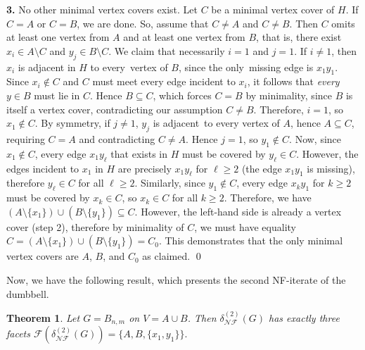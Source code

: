 \documentclass[12pt]{article}
\renewenvironment{proof}{{\noindent\bfseries Proof.}}{\qed}
\theoremstyle{plain}
\newtheorem{theorem}{Theorem}[section]
\theoremstyle{definition}
\newcommand{\F}{\mathcal{F}}
\newcommand{\V}{V}
\newcommand{\A}{A}
\newcommand{\B}{B}
\begin{document}
\begin{proof}
		\smallskip\noindent
		\textbf{3.} No other minimal vertex covers exist. Let $C$ be a minimal vertex cover of $H.$ 	If $C=\A$ or $C=\B$, we are done. So, assume that $C\neq \A$ and $C\neq \B$.
		Then $C$ omits at least one vertex from $\A$ and at least one vertex from $\B$, that is, there exist $x_i\in \A\setminus C$ and $y_j\in \B\setminus C$.		We claim that necessarily $i=1$ and $j=1$.
		 If $i\neq 1$, then $x_i$ is adjacent in $H$ to every vertex of $\B$, since the only missing edge is $x_1y_1$.
		Since $x_i\notin C$ and $C$ must meet every edge incident to $x_i$, it follows that \emph{every} $y\in\B$ must lie in $C$.
		Hence $\B\subseteq C$, which forces $C=\B$ by minimality, since $\B$ is itself a vertex cover,		contradicting our assumption $C\neq \B$. Therefore, $i=1$, so $x_1\notin C$. By symmetry, if $j\neq 1$, $y_j$ is adjacent to every vertex of $\A$, hence $\A\subseteq C$, requiring $C=\A$ and contradicting $C\neq\A$.	Hence $j=1$, so $y_1\notin C$.
		 Now, since $x_1\notin C$, every edge $x_1y_\ell$ that exists in $H$ must be covered by $y_\ell\in C$.
		However, the edges incident to $x_1$ in $H$ are precisely $x_1y_\ell$ for $\ell\ge 2$ (the edge $x_1y_1$ is missing), therefore $y_\ell\in C$ for all $\ell\ge 2$.
		Similarly, since $y_1\notin C$, every edge $x_k y_1$ for $k\ge 2$ must be covered by $x_k\in C$, so $x_k\in C$ for all $k\ge 2$.
		Therefore, we have $(\A\setminus\{x_1\})\cup(\B\setminus\{y_1\}) \subseteq C.$ 	However, the left-hand side is already a vertex cover (step 2), therefore by minimality of $C$, we must have equality
		 $C=(\A\setminus\{x_1\})\cup(\B\setminus\{y_1\})=C_0.$ 
		This demonstrates that the only minimal vertex covers are $\A$, $\B$, and $C_0$ as claimed.
	\end{proof}
	
	\medskip
	Now, we have the following result, which presents the second NF-iterate of the dumbbell.
	\begin{theorem}\label{thm:delta2}
		Let $G=B_{n,m}$ on $\V=\A\cup\B$. Then $\delta_{\mathcal{NF}}^{(2)}(G)$ has exactly three facets
		 $\F\!\left(\delta_{\mathcal{NF}}^{(2)}(G)\right) = \{\A, \B, \{x_1,y_1\}\}.$ 
	\end{theorem}
	
\end{document}
